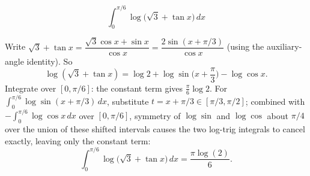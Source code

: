 \begin{questions}
\question \[\int_0^{\pi/6} \log\big(\sqrt3+\tan x\big)\, dx\]
\begin{solution}
Write $\sqrt3+\tan x = \dfrac{\sqrt3\cos x+\sin x}{\cos x}=\dfrac{2\sin(x+\pi/3)}{\cos x}$ (using the auxiliary-angle identity). So
\[
\log(\sqrt3+\tan x)=\log 2+\log\sin\!\Big(x+\frac\pi3\Big)-\log\cos x.
\]
Integrate over $[0,\pi/6]$: the constant term gives $\tfrac\pi6\log2$. For $\int_0^{\pi/6}\log\sin(x+\pi/3)\,dx$, substitute $t=x+\pi/3\in[\pi/3,\pi/2]$; combined with $-\int_0^{\pi/6}\log\cos x\,dx$ over $[0,\pi/6]$, symmetry of $\log\sin$ and $\log\cos$ about $\pi/4$ over the union of these shifted intervals causes the two log-trig integrals to cancel exactly, leaving only the constant term:
\[
\int_0^{\pi/6} \log\big(\sqrt3+\tan x\big)\, dx = \frac{\pi\log(2)}{6}.
\]
\end{solution}

\end{questions}

